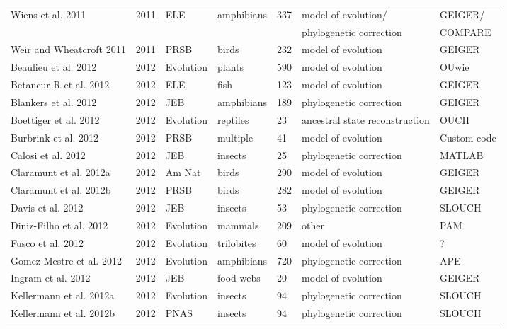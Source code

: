 \begin{landscape}
\begin{center}
\begin{longtable}{p{6cm}llllll}
Wiens et al. 2011 &   2011    &   ELE &   amphibians  &   337 &   model of evolution/ &   GEIGER/ \\
    &       &       &       &       &   phylogenetic correction &   COMPARE \\
Weir and Wheatcroft 2011  &   2011    &   PRSB    &   birds   &   232 &   model of evolution  &   GEIGER  \\
Beaulieu et al. 2012  &   2012    &   Evolution   &   plants  &   590 &   model of evolution  &   OUwie   \\
Betancur-R et al. 2012    &   2012    &   ELE &   fish    &   123 &   model of evolution  &   GEIGER  \\
Blankers et al. 2012  &   2012    &   JEB &   amphibians  &   189 &   phylogenetic correction &   GEIGER  \\
Boettiger et al. 2012 &   2012    &   Evolution   &   reptiles    &   23  &   ancestral state reconstruction  &   OUCH    \\
Burbrink et al. 2012  &   2012    &   PRSB    &   multiple    &   41  &   model of evolution  &   Custom code \\
Calosi et al. 2012    &   2012    &   JEB &   insects &   25  &   phylogenetic correction &   MATLAB  \\
Claramunt et al. 2012a    &   2012    &   Am Nat  &   birds   &   290 &   model of evolution  &   GEIGER  \\
Claramunt et al. 2012b    &   2012    &   PRSB    &   birds   &   282 &   model of evolution  &   GEIGER  \\
Davis et al. 2012 &   2012    &   JEB &   insects &   53  &   phylogenetic correction &   SLOUCH  \\
Diniz-Filho et al. 2012   &   2012    &   Evolution   &   mammals &   209 &   other   &   PAM \\
Fusco et al. 2012 &   2012    &   Evolution   &   trilobites  &   60  &   model of evolution  &   ?   \\
Gomez-Mestre et al. 2012  &   2012    &   Evolution   &   amphibians  &   720 &   phylogenetic correction &   APE \\
Ingram et al. 2012    &   2012    &   JEB &   food webs   &   20  &   model of evolution  &   GEIGER  \\
Kellermann et al. 2012a   &   2012    &   Evolution   &   insects &   94  &   phylogenetic correction &   SLOUCH  \\
Kellermann et al. 2012b   &   2012    &   PNAS    &   insects &   94  &   phylogenetic correction &   SLOUCH  \\

\end{longtable}
\end{center}
\end{landscape}
